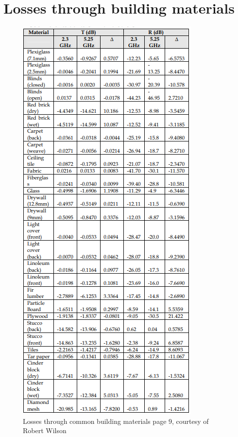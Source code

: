 \chapter{Losses through building materials}
\begin{figure}[h]
\centering
\includegraphics[scale=0.92]{figures/AbsorbsLoss.PNG}
\caption{Losses through common building materials\cite{Magis} page 9, courtesy of Robert Wilson  }
\end{figure}
